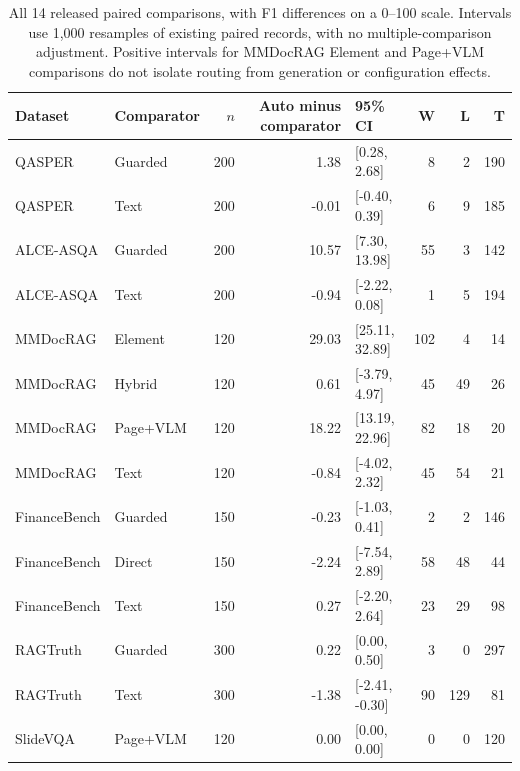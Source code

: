 \begin{table}[t]
\centering\small
\begin{tabular}{@{}llrrlrrr@{}}
\toprule
Dataset & Comparator & $n$ & Auto minus comparator & 95\% CI & W & L & T \\
\midrule
QASPER & Guarded & 200 & 1.38 & [0.28, 2.68] & 8 & 2 & 190 \\
QASPER & Text & 200 & -0.01 & [-0.40, 0.39] & 6 & 9 & 185 \\
ALCE-ASQA & Guarded & 200 & 10.57 & [7.30, 13.98] & 55 & 3 & 142 \\
ALCE-ASQA & Text & 200 & -0.94 & [-2.22, 0.08] & 1 & 5 & 194 \\
MMDocRAG & Element & 120 & 29.03 & [25.11, 32.89] & 102 & 4 & 14 \\
MMDocRAG & Hybrid & 120 & 0.61 & [-3.79, 4.97] & 45 & 49 & 26 \\
MMDocRAG & Page+VLM & 120 & 18.22 & [13.19, 22.96] & 82 & 18 & 20 \\
MMDocRAG & Text & 120 & -0.84 & [-4.02, 2.32] & 45 & 54 & 21 \\
FinanceBench & Guarded & 150 & -0.23 & [-1.03, 0.41] & 2 & 2 & 146 \\
FinanceBench & Direct & 150 & -2.24 & [-7.54, 2.89] & 58 & 48 & 44 \\
FinanceBench & Text & 150 & 0.27 & [-2.20, 2.64] & 23 & 29 & 98 \\
RAGTruth & Guarded & 300 & 0.22 & [0.00, 0.50] & 3 & 0 & 297 \\
RAGTruth & Text & 300 & -1.38 & [-2.41, -0.30] & 90 & 129 & 81 \\
SlideVQA & Page+VLM & 120 & 0.00 & [0.00, 0.00] & 0 & 0 & 120 \\
\bottomrule
\end{tabular}
\caption{All 14 released paired comparisons, with F1 differences on a 0--100 scale. Intervals use 1,000 resamples of existing paired records, with no multiple-comparison adjustment. Positive intervals for MMDocRAG Element and Page+VLM comparisons do not isolate routing from generation or configuration effects.}
\label{tab:all-ci}
\end{table}
